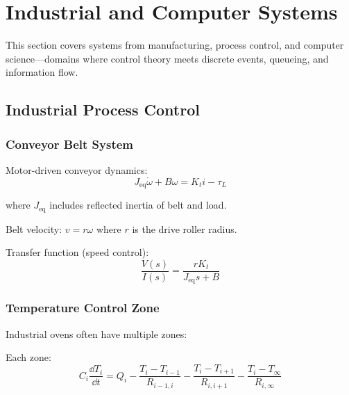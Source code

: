 
\chapter{Industrial and Computer Systems}
\label{ch:industrial_computer}

This section covers systems from manufacturing, process control, and computer science---domains where control theory meets discrete events, queueing, and information flow.

\section{Industrial Process Control}
\label{sec:industrial_process}

\subsection{Conveyor Belt System}



Motor-driven conveyor dynamics:
\begin{equation}
J_{\text{eq}}\dot{\omega} + B\omega = K_t i - \tau_L
\end{equation}

where $J_{\text{eq}}$ includes reflected inertia of belt and load.

Belt velocity: $v = r\omega$ where $r$ is the drive roller radius.

Transfer function (speed control):
\begin{equation}
\frac{V(s)}{I(s)} = \frac{rK_t}{J_{\text{eq}}s + B}
\end{equation}

\subsection{Temperature Control Zone}

Industrial ovens often have multiple zones:



Each zone:
\begin{equation}
C_i\frac{\dd T_i}{\dd t} = Q_i - \frac{T_i - T_{i-1}}{R_{i-1,i}} - \frac{T_i - T_{i+1}}{R_{i,i+1}} - \frac{T_i - T_{\infty}}{R_{i,\infty}}
\end{equation}

